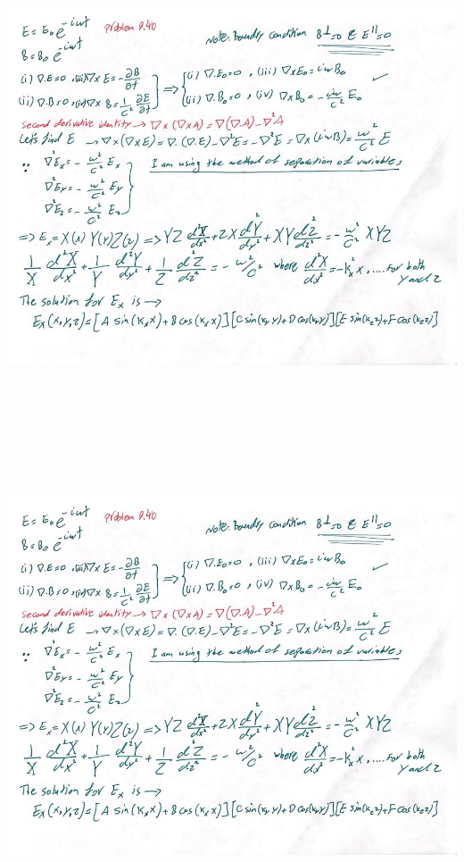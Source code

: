 \documentclass[fleqn]{article}
\begin{document}
\begin{enumerate}
    \begin{center}
      \includegraphics[height=14cm, width=16cm]{1.JPG}
    \end{center}

    \pagebreak

    \begin{center}
      \includegraphics[height=14cm, width=16cm]{1.JPG}
    \end{center}


\end{enumerate}
\end{document}
